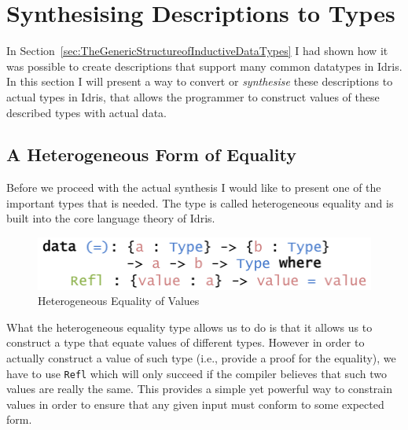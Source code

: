 \documentclass{ituthesis}
\begin{document}



\section{Synthesising Descriptions to Types}
\label{sec:SynthesisingDescriptionstoTypes}
In Section~\ref{sec:TheGenericStructureofInductiveDataTypes} I had shown how it was possible to create descriptions that support many common datatypes in Idris.
In this section I will present a way to convert or \textit{synthesise} these descriptions to actual types in Idris, that allows the programmer to construct values of these described types with actual data.

\subsection{A Heterogeneous Form of Equality}
\label{sub:AHeterogeneousFormofEquality}
Before we proceed with the actual synthesis I would like to present one of the important types that is needed.
The type is called heterogeneous equality and is built into the core language theory of Idris.
\begin{figure}[ht]
\begin{center}
    \includegraphics[scale=0.5]{Figures/HeterogeneousEquality.png}
\end{center}
\caption{Heterogeneous Equality of Values}
\label{fig:heteq}
\end{figure}
What the heterogeneous equality type allows us to do is that it allows us to construct a type that equate values of different types.
However in order to actually construct a value of such type (i.e., provide a proof for the equality), we have to use \texttt{Refl} which will only succeed if the compiler believes that such two values are really the same.
This provides a simple yet powerful way to constrain values in order to ensure that any given input must conform to some expected form.
\end{document}
